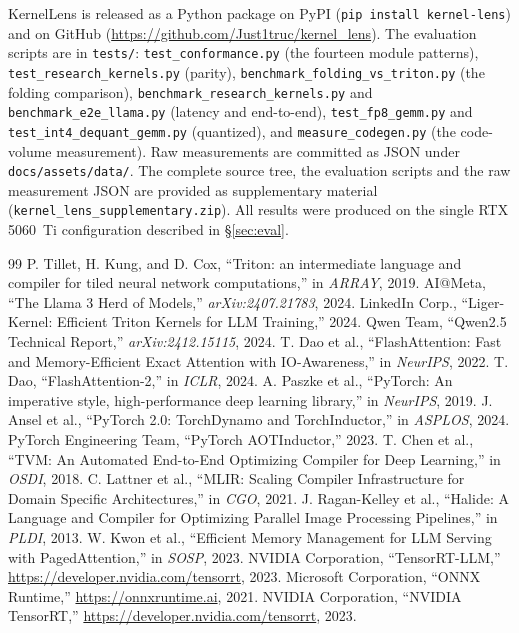 \documentclass[10pt]{article}
\begin{document}
KernelLens is released as a Python package on PyPI (\texttt{pip install
kernel-lens}) and on GitHub (\url{https://github.com/Just1truc/kernel_lens}). The
evaluation scripts are in \texttt{tests/}: \texttt{test\_conformance.py} (the
fourteen module patterns), \texttt{test\_research\_kernels.py} (parity),
\texttt{benchmark\_folding\_vs\_triton.py} (the folding comparison),
\texttt{benchmark\_research\_kernels.py} and \texttt{benchmark\_e2e\_llama.py}
(latency and end-to-end), \texttt{test\_fp8\_gemm.py} and
\texttt{test\_int4\_dequant\_gemm.py} (quantized), and
\texttt{measure\_codegen.py} (the code-volume measurement). Raw measurements are
committed as JSON under \texttt{docs/assets/data/}. The complete source tree, the
evaluation scripts and the raw measurement JSON are provided as supplementary
material (\texttt{kernel\_lens\_supplementary.zip}). All results were produced on
the single RTX 5060~Ti configuration described in \S\ref{sec:eval}.

\FloatBarrier
\begin{thebibliography}{99}
 P. Tillet, H. Kung, and D. Cox, ``Triton: an intermediate language and compiler for tiled neural network computations,'' in \textit{ARRAY}, 2019.
 AI@Meta, ``The Llama 3 Herd of Models,'' \textit{arXiv:2407.21783}, 2024.
 LinkedIn Corp., ``Liger-Kernel: Efficient Triton Kernels for LLM Training,'' 2024.
 Qwen Team, ``Qwen2.5 Technical Report,'' \textit{arXiv:2412.15115}, 2024.
 T. Dao et al., ``FlashAttention: Fast and Memory-Efficient Exact Attention with IO-Awareness,'' in \textit{NeurIPS}, 2022.
 T. Dao, ``FlashAttention-2,'' in \textit{ICLR}, 2024.
 A. Paszke et al., ``PyTorch: An imperative style, high-performance deep learning library,'' in \textit{NeurIPS}, 2019.
 J. Ansel et al., ``PyTorch 2.0: TorchDynamo and TorchInductor,'' in \textit{ASPLOS}, 2024.
 PyTorch Engineering Team, ``PyTorch AOTInductor,'' 2023.
 T. Chen et al., ``TVM: An Automated End-to-End Optimizing Compiler for Deep Learning,'' in \textit{OSDI}, 2018.
 C. Lattner et al., ``MLIR: Scaling Compiler Infrastructure for Domain Specific Architectures,'' in \textit{CGO}, 2021.
 J. Ragan-Kelley et al., ``Halide: A Language and Compiler for Optimizing Parallel Image Processing Pipelines,'' in \textit{PLDI}, 2013.
 W. Kwon et al., ``Efficient Memory Management for LLM Serving with PagedAttention,'' in \textit{SOSP}, 2023.
 NVIDIA Corporation, ``TensorRT-LLM,'' \url{https://developer.nvidia.com/tensorrt}, 2023.
 Microsoft Corporation, ``ONNX Runtime,'' \url{https://onnxruntime.ai}, 2021.
 NVIDIA Corporation, ``NVIDIA TensorRT,'' \url{https://developer.nvidia.com/tensorrt}, 2023.
\end{thebibliography}
\end{document}
